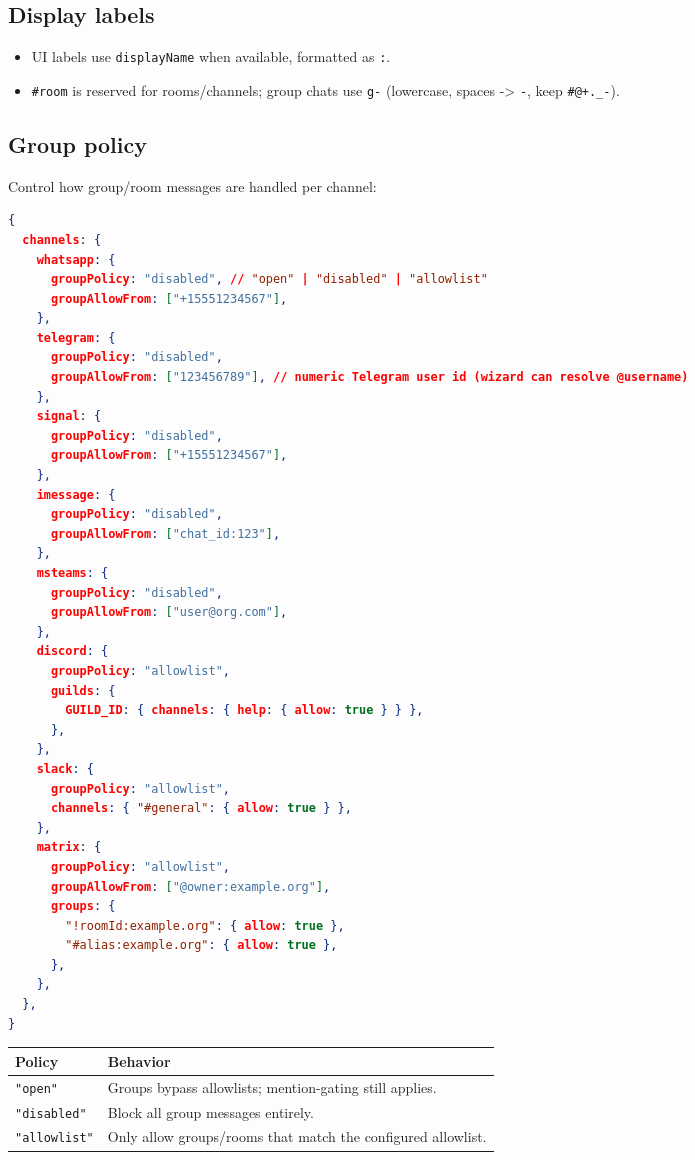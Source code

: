 \subsection{Display labels}


\begin{itemize}
  \item UI labels use \texttt{displayName} when available, formatted as \texttt{:}.
  \item \texttt{\#room} is reserved for rooms/channels; group chats use \texttt{g-} (lowercase, spaces -> \texttt{-}, keep \texttt{\#@+.\_-}).
\end{itemize}


\subsection{Group policy}


Control how group/room messages are handled per channel:

\begin{lstlisting}[language=json]
{
  channels: {
    whatsapp: {
      groupPolicy: "disabled", // "open" | "disabled" | "allowlist"
      groupAllowFrom: ["+15551234567"],
    },
    telegram: {
      groupPolicy: "disabled",
      groupAllowFrom: ["123456789"], // numeric Telegram user id (wizard can resolve @username)
    },
    signal: {
      groupPolicy: "disabled",
      groupAllowFrom: ["+15551234567"],
    },
    imessage: {
      groupPolicy: "disabled",
      groupAllowFrom: ["chat_id:123"],
    },
    msteams: {
      groupPolicy: "disabled",
      groupAllowFrom: ["user@org.com"],
    },
    discord: {
      groupPolicy: "allowlist",
      guilds: {
        GUILD_ID: { channels: { help: { allow: true } } },
      },
    },
    slack: {
      groupPolicy: "allowlist",
      channels: { "#general": { allow: true } },
    },
    matrix: {
      groupPolicy: "allowlist",
      groupAllowFrom: ["@owner:example.org"],
      groups: {
        "!roomId:example.org": { allow: true },
        "#alias:example.org": { allow: true },
      },
    },
  },
}
\end{lstlisting}



\begin{table}[h]
\centering
\small
\begin{tabular}{|l|l|}
\hline
Policy & Behavior \\
\hline
\texttt{"open"} & Groups bypass allowlists; mention-gating still applies. \\
\hline
\texttt{"disabled"} & Block all group messages entirely. \\
\hline
\texttt{"allowlist"} & Only allow groups/rooms that match the configured allowlist. \\
\hline
\end{tabular}
\end{table}




